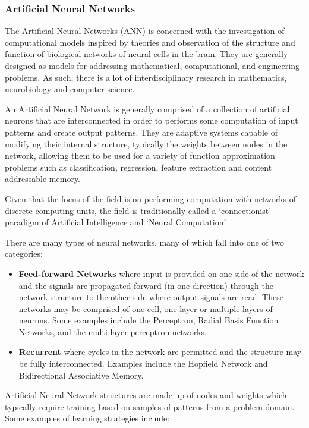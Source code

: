 \documentclass[a4paper, 11pt]{article}
\begin{document}
\subsubsection{Artificial Neural Networks}
The Artificial Neural Networks (ANN) is concerned with the investigation of computational models inspired by theories and observation of the structure and function of biological networks of neural cells in the brain. They are generally designed as models for addressing mathematical, computational, and engineering problems. As such, there is a lot of interdisciplinary research in mathematics, neurobiology and computer science. 

An Artificial Neural Network is generally comprised of a collection of artificial neurons that are interconnected in order to performs some computation of input patterns and create output patterns. They are adaptive systems capable of modifying their internal structure, typically the weights between nodes in the network, allowing them to be used for a variety of function approximation problems such as classification, regression, feature extraction and content addressable memory.

Given that the focus of the field is on performing computation with networks of discrete computing units, the field is traditionally called a `connectionist' paradigm of Artificial Intelligence and `Neural Computation'.

There are many types of neural networks, many of which fall into one of two categories:

\begin{itemize}
	\item \textbf{Feed-forward Networks} where input is provided on one side of the network and the signals are propagated forward (in one direction) through the network structure to the other side where output signals are read. These networks may be comprised of one cell, one layer or multiple layers of neurons. Some examples include the Perceptron, Radial Basis Function Networks, and the multi-layer perceptron networks.
	\item \textbf{Recurrent} where cycles in the network are permitted and the structure may be fully interconnected. Examples include the Hopfield Network and Bidirectional Associative Memory.
\end{itemize}

Artificial Neural Network structures are made up of nodes and weights which typically require training based on samples of patterns from a problem domain. Some examples of learning strategies include:
\end{document}
